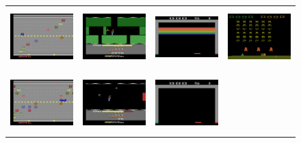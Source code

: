 \documentclass{article}
\begin{document}
\begin{figure}[t]
    \centering
    \def\arraystretch{0.75}
    \begin{tabular}{cccc}
        \includegraphics[height=0.9in, width=1.2in]{figures/alemodes/freeway_m0.png}
        & \includegraphics[height=0.9in, width=1.2in]{figures/alemodes/hero_m0.png}
        & \includegraphics[height=0.9in, width=1.2in]{figures/alemodes/breakout_m0.png}
        & \includegraphics[height=0.9in, width=1.2in]{figures/alemodes/space_invaders_m0.png} \\
        \includegraphics[height=0.9in, width=1.2in]{figures/alemodes/freeway_m1.png}
        & \includegraphics[height=0.9in, width=1.2in]{figures/alemodes/hero_m1.png}
        & \includegraphics[height=0.9in, width=1.2in]{figures/alemodes/breakout_m12.png}

\end{tabular}
\end{figure}
\end{document}

